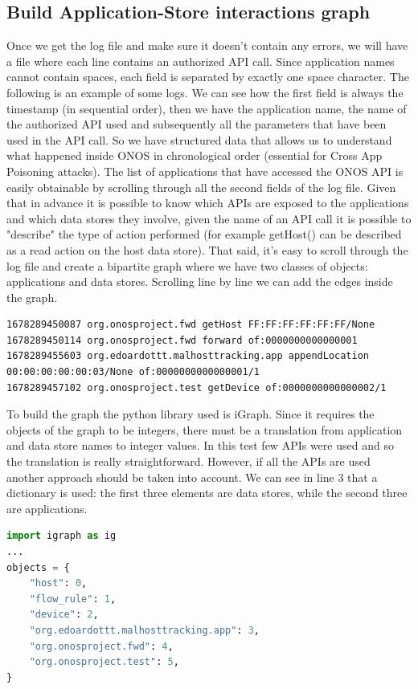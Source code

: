 \subsection{Build Application-Store interactions graph}
Once we get the log file and make sure it doesn't contain any errors, we will have a file where each line contains an authorized API call. Since application names cannot contain spaces, each field is separated by exactly one space character. The following is an example of some logs. We can see how the first field is always the timestamp (in sequential order), then we have the application name, the name of the authorized API used and subsequently all the parameters that have been used in the API call. So we have structured data that allows us to understand what happened inside ONOS in chronological order (essential for Cross App Poisoning attacks). The list of applications that have accessed the ONOS API is easily obtainable by scrolling through all the second fields of the log file. Given that in advance it is possible to know which APIs are exposed to the applications and which data stores they involve, given the name of an API call it is possible to "describe" the type of action performed (for example getHost() can be described as a read action on the host data store). That said, it's easy to scroll through the log file and create a bipartite graph where we have two classes of objects: applications and data stores. Scrolling line by line we can add the edges inside the graph.
\begin{lstlisting}
1678289450087 org.onosproject.fwd getHost FF:FF:FF:FF:FF:FF/None
1678289450114 org.onosproject.fwd forward of:0000000000000001
1678289455603 org.edoardottt.malhosttracking.app appendLocation 00:00:00:00:00:03/None of:0000000000000001/1
1678289457102 org.onosproject.test getDevice of:0000000000000002/1
\end{lstlisting}

To build the graph the python library used is iGraph. Since it requires the objects of the graph to be integers, there must be a translation from application and data store names to integer values. In this test few APIs were used and so the translation is really straightforward. However, if all the APIs are used another approach should be taken into account. We can see in line 3 that a dictionary is used: the first three elements are data stores, while the second three are applications.
\begin{lstlisting}[language=python,firstnumber=1]
import igraph as ig
...
objects = {
    "host": 0,
    "flow_rule": 1,
    "device": 2,
    "org.edoardottt.malhosttracking.app": 3,
    "org.onosproject.fwd": 4,
    "org.onosproject.test": 5,
}
\end{lstlisting}

